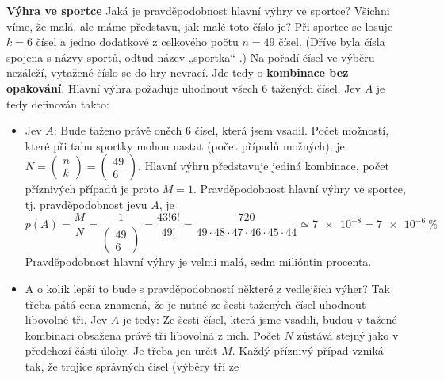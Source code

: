 \wikitextrule
\begin{example}\label{mai:exam052}
  \textbf{Výhra ve sportce}\newline\small
  Jaká je pravděpodobnost hlavní výhry ve sportce? Všichni víme, že malá, ale máme představu, jak 
  malé toto číslo je? Při sportce se losuje \(k = 6\) čísel a jedno dodatkové z celkového počtu \(n 
  = 49\) čísel. (Dříve byla čísla spojena s názvy sportů, odtud název „sportka“ .) Na pořadí čísel 
  ve výběru nezáleží, vytažené číslo se do hry nevrací. Jde tedy o \textbf{kombinace bez 
  opakování}. Hlavní výhra požaduje uhodnout všech \num{6} tažených čísel. Jev \(A\) je tedy 
  definován takto:
  
  \begin{itemize}
    \item Jev \(A\): Bude taženo právě oněch \num{6} čísel, která jsem vsadil.
          Počet možností, které při tahu sportky mohou nastat (počet případů možných), je \(N = 
          \begin{pmatrix} n \\ k\end{pmatrix} =  \begin{pmatrix} 49 \\ 6 \end{pmatrix} \). Hlavní 
          výhru představuje jediná kombinace, počet příznivých případů je proto \(M = 1\). 
          Pravděpodobnost hlavní výhry ve sportce, tj. pravděpodobnost jevu \(A\), je
          \begin{equation*}
            p(A) = \dfrac{M}{N} = \dfrac{1}{\begin{pmatrix} 49 \\ 6 \end{pmatrix}} 
                 = \dfrac{43!6!}{49!} = \dfrac{720}{49\cdot48\cdot47\cdot46\cdot45\cdot44} 
                   \simeq \num{7e-8}
                 = \SI{7e-6}{\percent}
          \end{equation*}
          Pravděpodobnost hlavní výhry je velmi malá, sedm milióntin procenta. 
    \item A o kolik lepší to bude s pravděpodobností některé z vedlejších výher? Tak třeba pátá 
          cena znamená, že je nutné ze šesti tažených čísel uhodnout libovolné tři. Jev \(A\) je 
          tedy: Ze šesti čísel, která jsme vsadili, budou v tažené kombinaci obsažena právě tři 
          libovolná z nich. Počet \(N\) zůstává stejný jako v předchozí části úlohy. Je třeba jen 
          určit \(M\). Každý příznivý případ vzniká tak, že trojice správných čísel (výběry tří ze 

\end{itemize}
\end{example}
